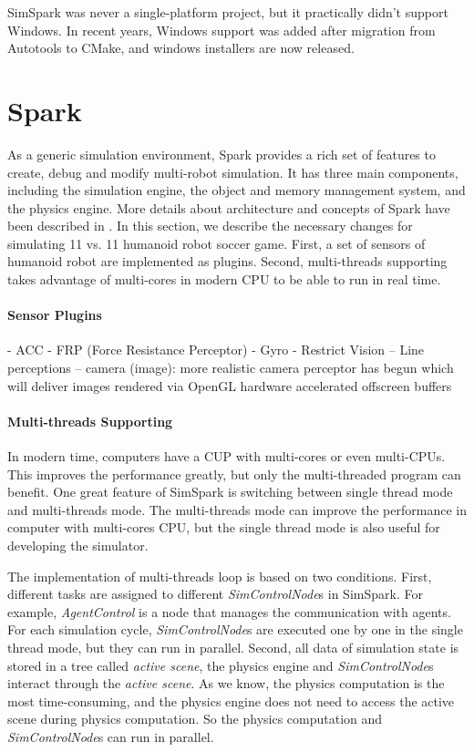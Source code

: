 \documentclass{llncs}
\begin{document}
SimSpark was never a single-platform project, but it practically didn't support 
Windows. In recent years, Windows support was added after migration from Autotools
to CMake, and windows installers are now released. 

\section{Spark}
\label{s:spark}
As a generic simulation environment, Spark provides a rich set of features to create, debug and modify multi-robot simulation.
It has three main components, including the simulation engine, the object and memory management system, and the physics engine. More details about architecture and concepts of Spark have been described in \cite{Boedecker2008}. 
In this section, we describe the necessary changes for simulating 11 vs. 11 humanoid robot soccer game.
First, a set of sensors of humanoid robot are implemented as plugins. Second, multi-threads supporting takes advantage of multi-cores in modern CPU to be able to run in real time.

\paragraph{Sensor Plugins}

 - ACC
 - FRP (Force Resistance Perceptor)
 - Gyro
 - Restrict Vision
 -- Line perceptions
 -- camera (image): more realistic camera perceptor has begun which will
deliver images rendered via OpenGL hardware accelerated offscreen buffers

\paragraph{Multi-threads Supporting}
In modern time, computers have a CUP with multi-cores or even multi-CPUs.
This improves the performance greatly, but only the multi-threaded program can benefit.
One great feature of SimSpark is switching between single thread mode and multi-threads
mode. The multi-threads mode can improve the performance in computer with multi-cores CPU, but the single thread mode is also useful for developing the simulator. 

The implementation of multi-threads loop is based on two conditions.
First, different tasks are assigned to different \textit{SimControlNode}s in SimSpark.
For example, \textit{AgentControl} is a node that manages the communication with agents.
For each simulation cycle, \textit{SimControlNode}s are executed one by one in the single thread mode, but they can run in parallel.
Second, all data of simulation state is stored in a tree called \textit{active scene},
the physics engine and \textit{SimControlNode}s interact through the \textit{active scene}.
As we know, the physics computation is the most time-consuming, and the physics engine does not need to access the active scene during physics computation.
So the physics computation and \textit{SimControlNode}s can run in parallel.
\end{document}
